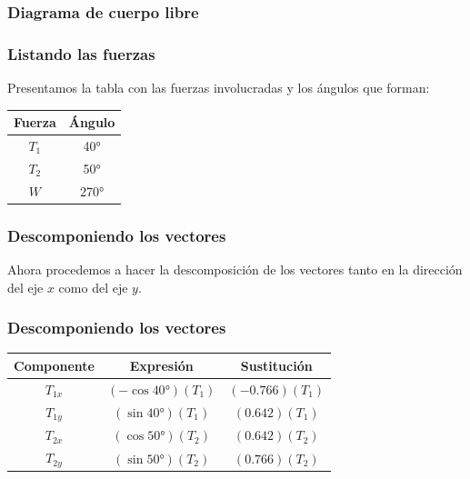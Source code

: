 \documentclass[12pt]{beamer}
\begin{document}
\begin{frame}
\frametitle{Diagrama de cuerpo libre}
\begin{figure}
\centering
{}
\end{figure}
\end{frame}
\begin{frame}
\frametitle{Listando las fuerzas}
Presentamos la tabla con las fuerzas involucradas y los ángulos que forman:
\pause
\begin{table}
\centering
\begin{tabular}{c | c}
Fuerza & Ángulo \\ \hline
$T_{1}$ & \ang{40} \\ \hline
$T_{2}$ & \ang{50} \\ \hline
$W$ & \ang{270} \\ \hline
\end{tabular}
\end{table}
\end{frame}
\begin{frame}
\frametitle{Descomponiendo los vectores}
Ahora procedemos a hacer la descomposición de los vectores tanto en la dirección del eje $x$ como del eje $y$.
\end{frame}
\begin{frame}
\frametitle{Descomponiendo los vectores}
\begin{table}
\centering
\begin{tabular}{c | c | c}
Componente & Expresión & Sustitución \\ \hline
$T_{1x}$ & $(- \cos \ang{40})(T_{1})$ & $(-0.766) (T_{1})$ \\ \hline
$T_{1y}$ & $(\sin \ang{40})(T_{1})$ & $(0.642) (T_{1})$ \\ \hline
$T_{2x}$ & $(\cos \ang{50})(T_{2})$ & $(0.642) (T_{2})$ \\ \hline
$T_{2y}$ & $(\sin \ang{50})(T_{2})$ & $(0.766) (T_{2})$ \\ \hline
\end{tabular}
\end{table}
\end{frame}
\end{document}
